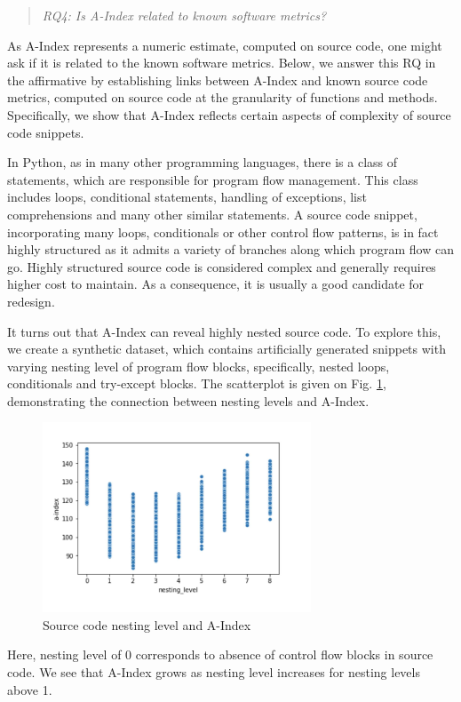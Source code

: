\documentclass[10pt,conference]{IEEEtran}
\begin{document}
\begin{quote}\emph{RQ4: Is A-Index related to known software metrics?}\end{quote}

As {\sc A-Index} represents a numeric estimate, computed on source code,
one might ask if it is related to the known software metrics. Below, we answer this RQ in
the affirmative by establishing links between {\sc A-Index} and known source code metrics,
computed on source code at the granularity of functions and methods. 
Specifically, we show that {\sc A-Index} reflects certain aspects
of complexity of source code snippets. 

In Python, as in many other programming languages,
there is a class of statements, which are responsible for program flow management. This class includes loops,
conditional statements, handling of exceptions, list comprehensions and many other similar statements. 
A source code snippet, incorporating many loops, conditionals
or other control flow patterns, is in fact highly structured as it admits a variety of branches along which
program flow can go. Highly structured source code is considered complex and generally requires higher cost to maintain. 
As a consequence, it is usually a good candidate for redesign. 

It turns out that {\sc A-Index} can reveal 
highly nested source code.
To explore this, we create a synthetic dataset, which contains artificially generated snippets 
with varying nesting level of program flow blocks, specifically, nested loops, conditionals and try-except blocks.
The scatterplot is given on Fig. \ref{nesting_level_vs_a_index}, demonstrating the connection between nesting levels and {\sc A-Index}.
\begin{figure}
\begin{center}
\includegraphics[width=8cm]{nested_code_vs_a_index.pdf}
\caption{Source code nesting level and {\sc A-Index}}\label{nesting_level_vs_a_index}
\end{center}
\end{figure}
Here, nesting level of 0 corresponds to absence of control flow blocks in source code.
We see that {\sc A-Index} grows as nesting level increases for nesting levels above 1.
\end{document}
